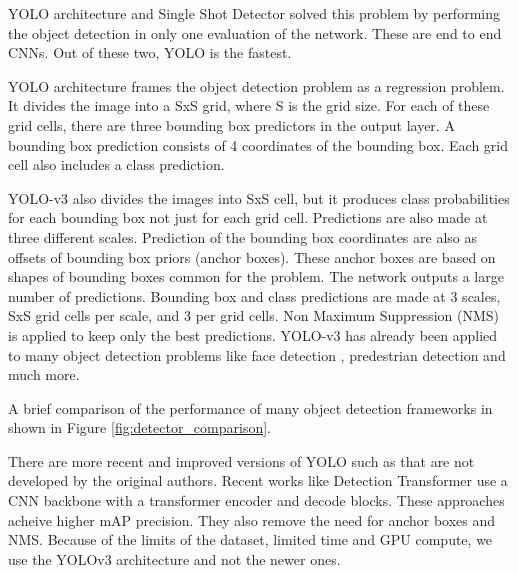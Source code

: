 \documentclass[10pt,twocolumn,letterpaper]{article}
\begin{document}
YOLO architecture and Single Shot Detector \cite{SSD_v1} solved this problem by performing the object detection in only one evaluation of the network. These are end to end CNNs. Out of these two, YOLO is the fastest. 

YOLO architecture frames the object detection problem as a regression problem. It divides the image into a SxS grid, where S is the grid size. For each of these grid cells, there are three bounding box predictors in the output layer. A bounding box prediction consists of 4 coordinates of the bounding box. Each grid cell also includes a class prediction. 

YOLO-v3 also divides the images into SxS cell, but it produces class probabilities for each bounding box not just for each grid cell. Predictions are also made at three different scales. Prediction of the bounding box coordinates are also as offsets of bounding box priors (anchor boxes). These anchor boxes are based on shapes of bounding boxes common for the problem. The network outputs a large number of predictions. Bounding box and class predictions are made at 3 scales, SxS grid cells per scale, and 3 per grid cells. Non Maximum Suppression (NMS) is applied to keep only the best predictions. YOLO-v3 has already been applied to many object detection problems like face detection \cite{face_detection_yolo}, predestrian detection \cite{pedestrian_detection} and much more.

A brief comparison of the performance of many object detection frameworks in shown in Figure \ref {fig:detector_comparison}.

There are more recent and improved versions of YOLO such as \cite{yolov7} that are not developed by the original authors. Recent works like Detection Transformer \cite{DETR} use a CNN backbone with a transformer encoder and decode blocks. These approaches acheive higher mAP precision. They also remove the need for anchor boxes and NMS. Because of the limits of the dataset, limited time and GPU compute, we use the YOLOv3 architecture and not the newer ones.
\end{document}
